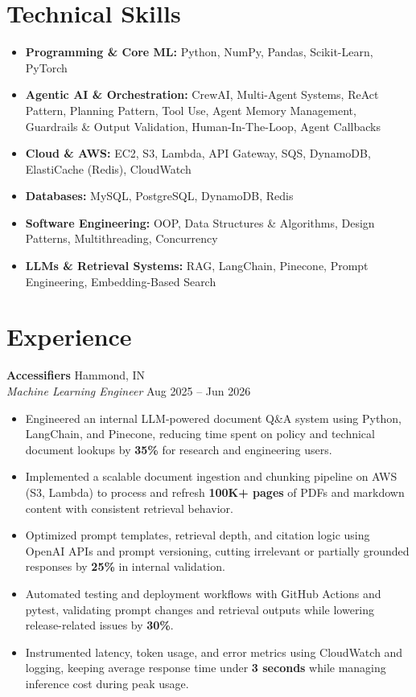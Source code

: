 \documentclass[10pt, letterpaper]{article}
\begin{document}
\section{Technical Skills}
\begin{itemize}[leftmargin=0.15in, label={}]
    \item \textbf{Programming \& Core ML:} Python, NumPy, Pandas, Scikit-Learn, PyTorch
    \item \textbf{Agentic AI \& Orchestration:} CrewAI, Multi-Agent Systems, ReAct Pattern, Planning Pattern, Tool Use, Agent Memory Management, Guardrails \& Output Validation, Human-In-The-Loop, Agent Callbacks
    \item \textbf{Cloud \& AWS:} EC2, S3, Lambda, API Gateway, SQS, DynamoDB, ElastiCache (Redis), CloudWatch
    \item \textbf{Databases:} MySQL, PostgreSQL, DynamoDB, Redis
    \item \textbf{Software Engineering:} OOP, Data Structures \& Algorithms, Design Patterns, Multithreading, Concurrency
    \item \textbf{LLMs \& Retrieval Systems:} RAG, LangChain, Pinecone, Prompt Engineering, Embedding-Based Search
\end{itemize}

\section{Experience}
\textbf{Accessifiers} \hfill Hammond, IN \\
\textit{Machine Learning Engineer} \hfill Aug 2025 -- Jun 2026
\begin{itemize}
    \item Engineered an internal LLM-powered document Q\&A system using Python, LangChain, and Pinecone, reducing time spent on policy and technical document lookups by \textbf{35\%} for research and engineering users.
    \item Implemented a scalable document ingestion and chunking pipeline on AWS (S3, Lambda) to process and refresh \textbf{100K+ pages} of PDFs and markdown content with consistent retrieval behavior.
    \item Optimized prompt templates, retrieval depth, and citation logic using OpenAI APIs and prompt versioning, cutting irrelevant or partially grounded responses by \textbf{25\%} in internal validation.
    \item Automated testing and deployment workflows with GitHub Actions and pytest, validating prompt changes and retrieval outputs while lowering release-related issues by \textbf{30\%}.
    \item Instrumented latency, token usage, and error metrics using CloudWatch and logging, keeping average response time under \textbf{3 seconds} while managing inference cost during peak usage.
\end{itemize}
\end{document}
